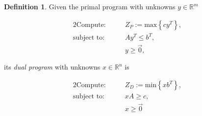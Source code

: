 \documentclass[10pt,a4paper,titlepage]{article}
\theoremstyle{plain}
\theoremstyle{definition}
\newtheorem{definition}[thm]{Definition} %
\begin{document}
\begin{definition}
    Given the primal program with unknowns $y \in \mathbb{R}^m$\vspace{-20pt}

    \begin{alignat*}{2}
        \text{Compute:}\qquad& Z_P := \text{max}\left\{ cy^T \right\},\\
        \text{subject to:}\qquad& Ay^T \leq b^T,\\
        & y \geq \vec{0},
    \end{alignat*}

    its \textit{dual program} with unknowns $x \in \mathbb{R}^n$ is\vspace{-20pt}

    \begin{alignat*}{2}
        \text{Compute:}\qquad& Z_D := \text{min}\left\{ xb^T \right\},\\
        \text{subject to:}\qquad& xA \geq c,\\
        & x \geq \vec{0}
    \end{alignat*}
\end{definition}
\end{document}
